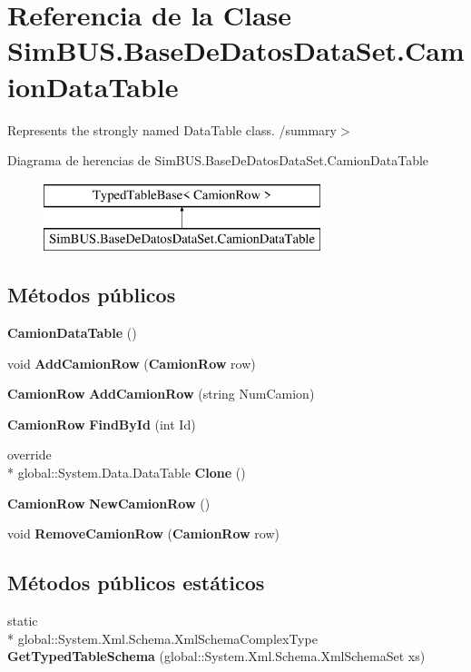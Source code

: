 \section{Referencia de la Clase Sim\-B\-U\-S.\-Base\-De\-Datos\-Data\-Set.\-Camion\-Data\-Table}
\label{class_sim_b_u_s_1_1_base_de_datos_data_set_1_1_camion_data_table}


Represents the strongly named Data\-Table class. /summary$>$  


Diagrama de herencias de Sim\-B\-U\-S.\-Base\-De\-Datos\-Data\-Set.\-Camion\-Data\-Table\begin{figure}[H]
\begin{center}
\leavevmode
\includegraphics[height=2.000000cm]{class_sim_b_u_s_1_1_base_de_datos_data_set_1_1_camion_data_table}
\end{center}
\end{figure}
\subsection*{Métodos públicos}
\begin{DoxyCompactItemize}
\item 
{\bf Camion\-Data\-Table} ()
\item 
void {\bf Add\-Camion\-Row} ({\bf Camion\-Row} row)
\item 
{\bf Camion\-Row} {\bf Add\-Camion\-Row} (string Num\-Camion)
\item 
{\bf Camion\-Row} {\bf Find\-By\-Id} (int Id)
\item 
override \\*
global\-::\-System.\-Data.\-Data\-Table {\bf Clone} ()
\item 
{\bf Camion\-Row} {\bf New\-Camion\-Row} ()
\item 
void {\bf Remove\-Camion\-Row} ({\bf Camion\-Row} row)
\end{DoxyCompactItemize}
\subsection*{Métodos públicos estáticos}
\begin{DoxyCompactItemize}
\item 
static \\*
global\-::\-System.\-Xml.\-Schema.\-Xml\-Schema\-Complex\-Type {\bf Get\-Typed\-Table\-Schema} (global\-::\-System.\-Xml.\-Schema.\-Xml\-Schema\-Set xs)
\end{DoxyCompactItemize}

